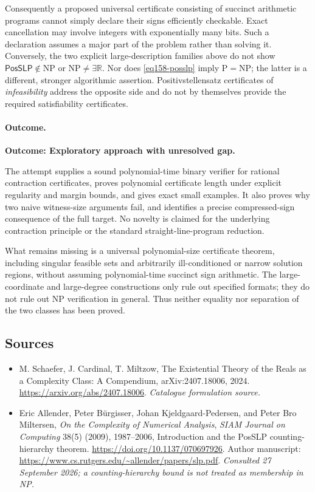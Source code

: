 \documentclass[11pt,a4paper]{article}
\newcommand{\R}{\mathbb{R}}
\numberwithin{equation}{section}
\begin{document}
Consequently a proposed universal certificate consisting of succinct
arithmetic programs cannot simply declare their signs efficiently
checkable. Exact cancellation may involve integers with exponentially
many bits. Such a declaration assumes a major part of the problem rather
than solving it. Conversely, the two explicit large-description families
above do not show $\textsf{PosSLP}\notin\mathrm{NP}$ or
$\mathrm{NP}\ne\exists\R$. Nor does \eqref{eq158-posslp} imply
$\mathrm P=\mathrm{NP}$; the latter is a different, stronger algorithmic
assertion. Positivstellensatz certificates of \emph{infeasibility} address
the opposite side and do not by themselves provide the required
satisfiability certificates.

\paragraph{Outcome.}
\textbf{Outcome: Exploratory approach with unresolved gap.}

The attempt supplies a sound polynomial-time binary verifier for rational
contraction certificates, proves polynomial certificate length under
explicit regularity and margin bounds, and gives exact small examples.
It also proves why two naive witness-size arguments fail, and identifies
a precise compressed-sign consequence of the full target. No novelty is
claimed for the underlying contraction principle or the standard
straight-line-program reduction.

What remains missing is a universal polynomial-size certificate theorem,
including singular feasible sets and arbitrarily ill-conditioned or
narrow solution regions, without assuming polynomial-time succinct sign
arithmetic. The large-coordinate and large-degree constructions only rule
out specified formats; they do not rule out NP verification in general.
Thus neither equality nor separation of the two classes has been proved.
\subsection{Sources}
\begin{itemize}\raggedright
\item[\textnormal{[S1]}]\hypertarget{source:158:1}{} M. Schaefer, J. Cardinal, T. Miltzow, The Existential Theory of the Reals as a Complexity Class: A Compendium, arXiv:2407.18006, 2024.
\url{https://arxiv.org/abs/2407.18006}.
{\small\textit{Catalogue formulation source.}}
\item[\textnormal{[E1]}]\hypertarget{extra:158:1}{} Eric Allender, Peter
B\"urgisser, Johan Kjeldgaard-Pedersen, and Peter Bro Miltersen,
\emph{On the Complexity of Numerical Analysis}, \emph{SIAM Journal on
Computing} 38(5) (2009), 1987--2006, Introduction and the PosSLP
counting-hierarchy theorem.
\url{https://doi.org/10.1137/070697926}.
Author manuscript: \url{https://www.cs.rutgers.edu/~allender/papers/slp.pdf}.
{\small\textit{Consulted 27 September 2026; a counting-hierarchy bound is
not treated as membership in NP.}}
\end{itemize}
\end{document}
